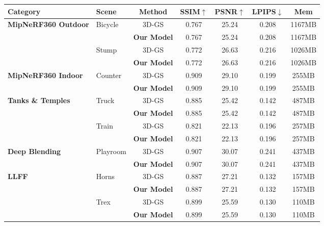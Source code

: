 
    \begin{tabular}{llccccc}
    \toprule
    \textbf{Category} & \textbf{Scene} & \textbf{Method} & \textbf{SSIM$\uparrow$} & \textbf{PSNR$\uparrow$} & \textbf{LPIPS$\downarrow$} & \textbf{Mem} \\
    \midrule
    \multirow{4}{*}{\textbf{MipNeRF360 Outdoor}} & 
        \multirow{2}{*}{Bicycle} 
        & 3D-GS & 0.767 & 25.24 & 0.208 & 1167MB \\
        & & \textbf{Our Model} & 0.767 & 25.24 & 0.208 & 1167MB \\
            \cmidrule{2-7} &
        \multirow{2}{*}{Stump} 
        & 3D-GS & 0.772 & 26.63 & 0.216 & 1026MB \\
        & & \textbf{Our Model} & 0.772 & 26.63 & 0.216 & 1026MB \\
        \midrule
    \multirow{2}{*}{\textbf{MipNeRF360 Indoor}} & 
        \multirow{2}{*}{Counter} 
        & 3D-GS & 0.909 & 29.10 & 0.199 & 255MB \\
        & & \textbf{Our Model} & 0.909 & 29.10 & 0.199 & 255MB \\
        \midrule
    \multirow{4}{*}{\textbf{Tanks \& Temples}} & 
        \multirow{2}{*}{Truck} 
        & 3D-GS & 0.885 & 25.42 & 0.142 & 487MB \\
        & & \textbf{Our Model} & 0.885 & 25.42 & 0.142 & 487MB \\
            \cmidrule{2-7} &
        \multirow{2}{*}{Train} 
        & 3D-GS & 0.821 & 22.13 & 0.196 & 257MB \\
        & & \textbf{Our Model} & 0.821 & 22.13 & 0.196 & 257MB \\
        \midrule
    \multirow{2}{*}{\textbf{Deep Blending}} & 
        \multirow{2}{*}{Playroom} 
        & 3D-GS & 0.907 & 30.07 & 0.241 & 437MB \\
        & & \textbf{Our Model} & 0.907 & 30.07 & 0.241 & 437MB \\
        \midrule
    \multirow{4}{*}{\textbf{LLFF}} & 
        \multirow{2}{*}{Horns} 
        & 3D-GS & 0.887 & 27.21 & 0.132 & 157MB \\
        & & \textbf{Our Model} & 0.887 & 27.21 & 0.132 & 157MB \\
            \cmidrule{2-7} &
        \multirow{2}{*}{Trex} 
        & 3D-GS & 0.899 & 25.59 & 0.130 & 110MB \\
        & & \textbf{Our Model} & 0.899 & 25.59 & 0.130 & 110MB \\
    \bottomrule
    \end{tabular}